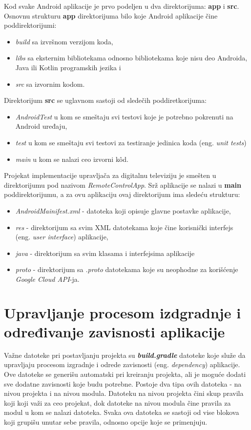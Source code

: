 \documentclass[implementacija.tex]{subfiles}
\begin{document}
Kod svake Android aplikacije je prvo podeljen u dva direktorijuma: \textbf{app} i \textbf{src}. Osnovnu strukturu \textbf{app} direktorijuma bilo koje Android aplikacije čine poddirektorijumi: 

\begin{itemize}
\item \textit{build} sa izvršnom verzijom koda,
\item \textit{libs} sa eksternim bibliotekama odnosno bibliotekama koje nisu deo Androida, Java ili Kotlin programskih jezika i
\item \textit{src} sa izvornim kodom.
\end{itemize}

 Direktorijum \textbf{src} se uglavnom sastoji od sledečih poddiretkorijuma: 
\begin{itemize}
\item \textit{AndroidTest} u kom se smeštaju svi testovi koje je potrebno pokrenuti na Android uređaju, 
\item \textit{test} u kom se smeštaju svi testovi za testiranje jedinica koda (eng. \textit{unit tests})
\item \textit{main} u kom se nalazi ceo izvorni k\^{o}d.
\end{itemize}

Projekat implementacije upravljača za digitalnu televiziju je smešten u direktorijumu pod nazivom \textit{RemoteControlApp}. Srž aplikacije se nalazi u \textbf{main} poddirektorijumu, a za ovu aplikaciju ovaj direktorijum ima sledeću strukturu:
\begin{itemize}
\item \textit{AndroidMainifest.xml} - datoteka koji opisuje glavne postavke aplikacije,
\item \textit{res} - direktorijum sa svim XML datotekama koje čine korisnički interfejs (eng. \textit{user interface}) aplikacije,
\item \textit{java} - direktorijum sa svim klasama i interfejsima aplikacije
\item \textit{proto} - direktorijum sa \textit{.proto} datotekama koje su neophodne za korišćenje \textit{Google Cloud API}-ja.
\end{itemize}

\section{Upravljanje procesom izdgradnje i određivanje zavisnosti aplikacije}

Važne datoteke pri postavljanju projekta su \textbf{\textit{build.gradle}} datoteke koje služe da  upravljaju procesom izgradnje i odrede zavisnosti (eng. \textit{dependency}) aplikacije. Ove datoteke se generišu automatski pri kreiranju projekta, ali je moguće dodati sve dodatne zavisnosti koje budu potrebne. Postoje dva tipa ovih datoteka - na nivou projekta i na nivou modula. Datoteku na nivou projekta čini skup pravila koji koji važi za ceo projekat, dok datoteke na nivou modula čine pravila za modul u kom se nalazi datoteka. Svaka ova datoteka se sastoji od vise blokova koji grupišu unutar sebe pravila, odnosno opcije koje se primenjuju.
\end{document}

